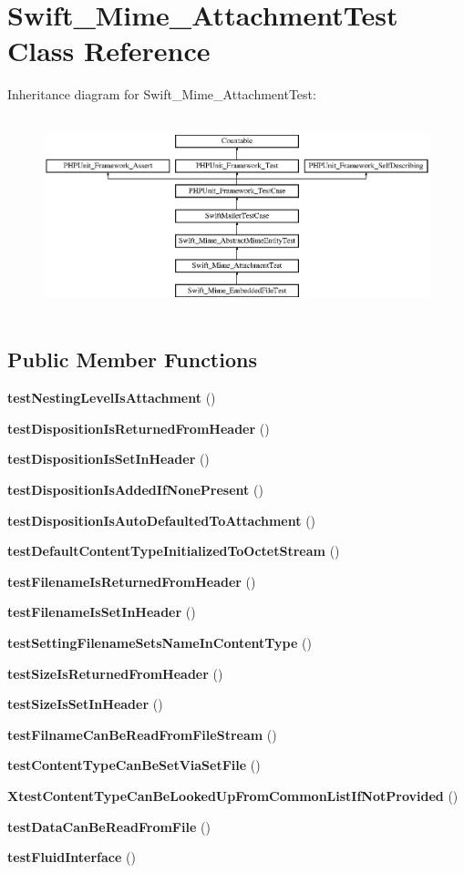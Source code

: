 \section{Swift\+\_\+\+Mime\+\_\+\+Attachment\+Test Class Reference}
\label{class_swift___mime___attachment_test}
Inheritance diagram for Swift\+\_\+\+Mime\+\_\+\+Attachment\+Test\+:\begin{figure}[H]
\begin{center}
\leavevmode
\includegraphics[height=5.781711cm]{class_swift___mime___attachment_test}
\end{center}
\end{figure}
\subsection*{Public Member Functions}
\begin{DoxyCompactItemize}
\item 
{\bf test\+Nesting\+Level\+Is\+Attachment} ()
\item 
{\bf test\+Disposition\+Is\+Returned\+From\+Header} ()
\item 
{\bf test\+Disposition\+Is\+Set\+In\+Header} ()
\item 
{\bf test\+Disposition\+Is\+Added\+If\+None\+Present} ()
\item 
{\bf test\+Disposition\+Is\+Auto\+Defaulted\+To\+Attachment} ()
\item 
{\bf test\+Default\+Content\+Type\+Initialized\+To\+Octet\+Stream} ()
\item 
{\bf test\+Filename\+Is\+Returned\+From\+Header} ()
\item 
{\bf test\+Filename\+Is\+Set\+In\+Header} ()
\item 
{\bf test\+Setting\+Filename\+Sets\+Name\+In\+Content\+Type} ()
\item 
{\bf test\+Size\+Is\+Returned\+From\+Header} ()
\item 
{\bf test\+Size\+Is\+Set\+In\+Header} ()
\item 
{\bf test\+Filname\+Can\+Be\+Read\+From\+File\+Stream} ()
\item 
{\bf test\+Content\+Type\+Can\+Be\+Set\+Via\+Set\+File} ()
\item 
{\bf Xtest\+Content\+Type\+Can\+Be\+Looked\+Up\+From\+Common\+List\+If\+Not\+Provided} ()
\item 
{\bf test\+Data\+Can\+Be\+Read\+From\+File} ()
\item 
{\bf test\+Fluid\+Interface} ()
\end{DoxyCompactItemize}
